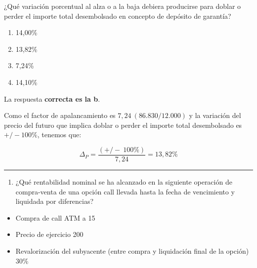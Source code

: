 \documentclass[
  letterpaper,
  DIV=11,
  numbers=noendperiod]{scrreprt}
\providecommand{\tightlist}{%
  \setlength{\itemsep}{0pt}\setlength{\parskip}{0pt}}\usepackage{longtable,booktabs,array}
\begin{document}
¿Qué variación porcentual al alza o a la baja debiera producirse para
doblar o perder el importe total desembolsado en concepto de depósito de
garantía?

\begin{enumerate}
\def\labelenumi{\alph{enumi})}
\item
  14,00\%
\item
  13,82\%
\item
  7,24\%
\item
  14,10\%
\end{enumerate}

\begin{tcolorbox}[enhanced jigsaw, left=2mm, opacityback=0, colback=white, breakable, arc=.35mm, bottomrule=.15mm, rightrule=.15mm, toprule=.15mm, leftrule=.75mm, colframe=quarto-callout-tip-color-frame]
\begin{minipage}[t]{5.5mm}
\textcolor{quarto-callout-tip-color}{\faLightbulb}
\end{minipage}%
\begin{minipage}[t]{\textwidth - 5.5mm}

La respuesta \textbf{correcta es la b}.

Como el factor de apalancamiento es \(7,24\ (86.830 / 12.000)\) y la
variación del precio del futuro que implica doblar o perder el importe
total desembolsado es \(+/-100\%\), tenemos que:

\[\Delta_P =\frac {(+/-\  100\% )}  {7,24 }= 13,82\%\]

\end{minipage}%
\end{tcolorbox}

\begin{center}\rule{0.5\linewidth}{0.5pt}\end{center}

\begin{enumerate}
\def\labelenumi{\arabic{enumi}.}
\setcounter{enumi}{69}
\tightlist
\item
  ¿Qué rentabilidad nominal se ha alcanzado en la siguiente operación de
  compra-venta de una opción call llevada hasta la fecha de vencimiento
  y liquidada por diferencias?
\end{enumerate}

\begin{itemize}
\item
  Compra de call ATM a 15
\item
  Precio de ejercicio 200
\item
  Revalorización del subyacente (entre compra y liquidación final de la
  opción) 30\%
\end{itemize}
\end{document}
